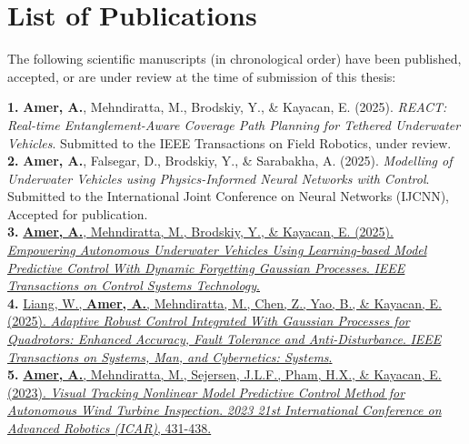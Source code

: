 \section*{List of Publications}
The following scientific manuscripts (in chronological order) have been published, accepted, or are under review at the time of submission of this thesis:

\vspace{1em}


\textbf{1.} \textbf{Amer, A.}, Mehndiratta, M., Brodskiy, Y., \& Kayacan, E. (2025). \textit{REACT: Real-time Entanglement-Aware Coverage Path Planning for Tethered Underwater Vehicles}. Submitted to the IEEE Transactions on Field Robotics, under review.\\[0.8em]

\textbf{2.} \textbf{Amer, A.}, Falsegar, D., Brodskiy, Y., \& Sarabakha, A. (2025). \textit{Modelling of Underwater Vehicles using Physics-Informed Neural Networks with Control}. Submitted to the International Joint Conference on Neural Networks (IJCNN), Accepted for publication.\\[0.8em]

\textbf{3.} \href{https://ieeexplore.ieee.org/document/10916556/authors#authors}{\textbf{Amer, A.}, Mehndiratta, M., Brodskiy, Y., \& Kayacan, E. (2025). \textit{Empowering Autonomous Underwater Vehicles Using Learning-based Model Predictive Control With Dynamic Forgetting Gaussian Processes}. \textit{IEEE Transactions on Control Systems Technology}.}\\[0.8em]

\textbf{4.} \href{https://ieeexplore.ieee.org/document/10900576}{Liang, W., \textbf{Amer, A.}, Mehndiratta, M., Chen, Z., Yao, B., \& Kayacan, E. (2025). \textit{Adaptive Robust Control Integrated With Gaussian Processes for Quadrotors: Enhanced Accuracy, Fault Tolerance and Anti-Disturbance}. \textit{IEEE Transactions on Systems, Man, and Cybernetics: Systems}.}\\[0.8em]

\textbf{5.} \href{https://ieeexplore.ieee.org/document/10406329}{\textbf{Amer, A.}, Mehndiratta, M., Sejersen, J.L.F., Pham, H.X., \& Kayacan, E. (2023). \textit{Visual Tracking Nonlinear Model Predictive Control Method for Autonomous Wind Turbine Inspection}. \textit{2023 21st International Conference on Advanced Robotics (ICAR)}, 431-438.}\\[0.8em]

